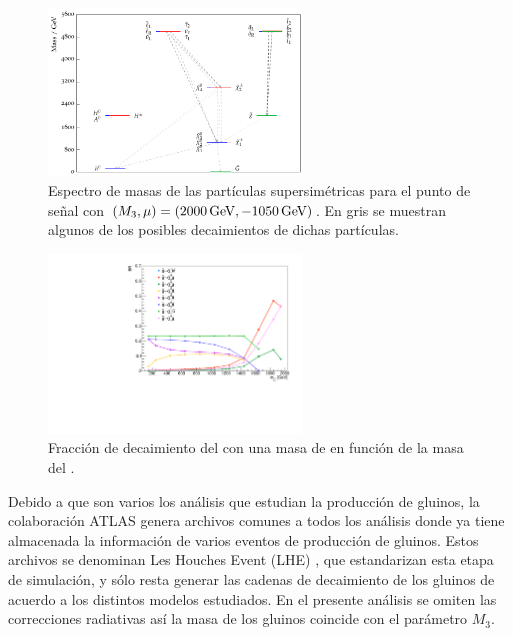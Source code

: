 \begin{figure}
  \centering
  \includegraphics[width=0.6\textwidth]{images/analysis/phb_mass_spectrum.pdf}
  \caption{Espectro de masas de las partículas supersimétricas para el punto de señal con $(M_3, \mu) = (2000\,\text{GeV}, -1050\,\text{GeV})$. En gris se muestran algunos de los posibles decaimientos de dichas partículas.}
  \label{fig:mass_spec}
\end{figure}

\begin{figure}
  \centering
  \includegraphics[width=0.6\textwidth]{images/analysis/phb_go_br.pdf}
  \caption{Fracción de decaimiento del \gluino con una masa de  en función de la masa del \ninoone.}
  \label{fig:gluino_decays}
\end{figure}



Debido a que son varios los análisis que estudian la producción de gluinos, la colaboración ATLAS genera archivos comunes a todos los análisis donde ya tiene almacenada la información de varios eventos de producción de gluinos. Estos archivos se denominan Les Houches Event (LHE) \cite{Alwall:2006yp}, que estandarizan esta etapa de simulación, y sólo resta generar las cadenas de decaimiento de los gluinos de acuerdo a los distintos modelos estudiados. En el presente análisis se omiten las correcciones radiativas así la masa de los gluinos coincide con el parámetro $M_3$.

